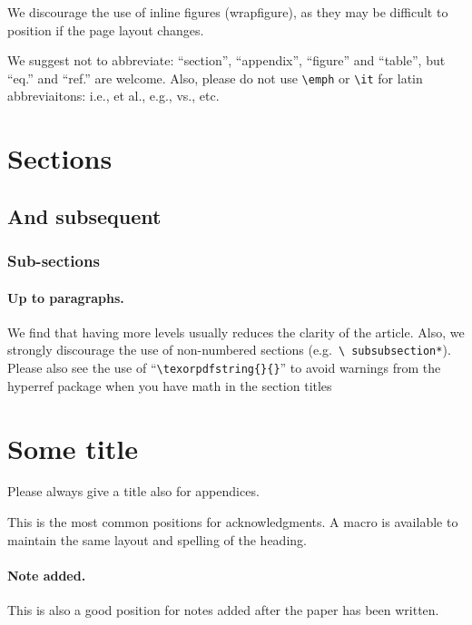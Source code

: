 \documentclass[letterpaper,12pt]{article}
\begin{document}
We discourage the use of inline figures (wrapfigure), as they may be
difficult to position if the page layout changes.

We suggest not to abbreviate: ``section'', ``appendix'', ``figure''
and ``table'', but ``eq.'' and ``ref.'' are welcome. Also, please do
not use \texttt{\textbackslash emph} or \texttt{\textbackslash it} for
latin abbreviaitons: i.e., et al., e.g., vs., etc.



\section{Sections}
\subsection{And subsequent}
\subsubsection{Sub-sections}
\paragraph{Up to paragraphs.} We find that having more levels usually
reduces the clarity of the article. Also, we strongly discourage the
use of non-numbered sections (e.g.~\texttt{\textbackslash
  subsubsection*}).  Please also see the use of
``\texttt{\textbackslash texorpdfstring\{\}\{\}}'' to avoid warnings
from the hyperref package when you have math in the section titles




\section{Some title}
Please always give a title also for appendices.





\acknowledgments

This is the most common positions for acknowledgments. A macro is
available to maintain the same layout and spelling of the heading.

\paragraph{Note added.} This is also a good position for notes added
after the paper has been written.


\end{document}

